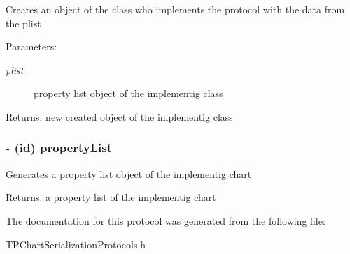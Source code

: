 Creates an object of the class who implements the protocol with the data from the plist \begin{Desc}
\item[Parameters:]
\begin{description}
\item[{\em plist}]property list object of the implementig class \end{description}
\end{Desc}
\begin{Desc}
\item[Returns:]new created object of the implementig class \end{Desc}
\hypertarget{protocol_t_p_chart_serialization_property_list-p_04773baf998426793bf2e587f4331927}{
\subsubsection[{propertyList}]{\setlength{\rightskip}{0pt plus 5cm}- (id) propertyList }}
\label{protocol_t_p_chart_serialization_property_list-p_04773baf998426793bf2e587f4331927}


Generates a property list object of the implementig chart \begin{Desc}
\item[Returns:]a property list of the implementig chart \end{Desc}


The documentation for this protocol was generated from the following file:\begin{CompactItemize}
\item 
TPChartSerializationProtocols.h\end{CompactItemize}
